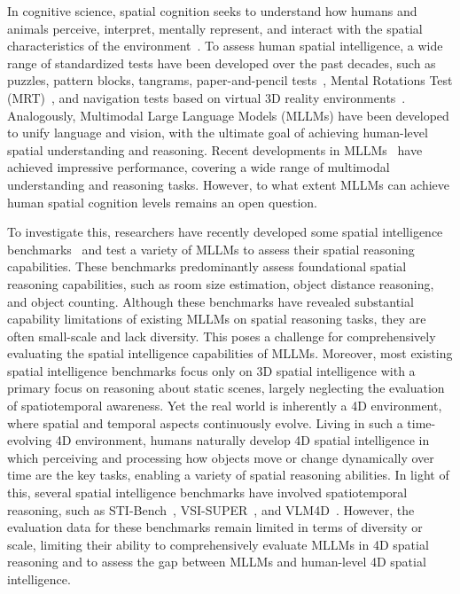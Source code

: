 \documentclass{article}
\begin{document}
In cognitive science, spatial cognition seeks to understand how humans and animals perceive, interpret, mentally represent, and interact with the spatial characteristics of the environment~\cite{waller2013handbook, newcombe2004spatial}.
To assess human spatial intelligence, a wide range of standardized tests have been developed over the past decades, such as puzzles, pattern blocks, tangrams, paper-and-pencil tests~\cite{carroll1993human,eliot1983international,hegarty2005individual}, Mental Rotations Test (MRT)~\cite{peters1995redrawn}, and navigation tests based on virtual 3D reality environments~\cite{wolbers2008spatial}.
Analogously, Multimodal Large Language Models (MLLMs) have been developed to unify language and vision, with the ultimate goal of achieving human-level spatial understanding and reasoning.
Recent developments in MLLMs~\cite{OpenAI2025,Gemini2025,zhang2025videollama,bai2025qwen2,wang2025internvl3} have achieved impressive performance, covering a wide range of multimodal understanding and reasoning tasks.
However, to what extent MLLMs can achieve human spatial cognition levels remains an open question.


To investigate this, researchers have recently developed some spatial intelligence benchmarks~\cite{Yang_2025_CVPR,yu2025far,liu2025mirage,gong2025space,deng2025internspatial,yang2025mmsi,ma20243dsrbench,cheng2024spatialrgpt,zhao2025mmvu,tang2025lego} and test a variety of MLLMs to assess their spatial reasoning capabilities.
These benchmarks predominantly assess foundational spatial reasoning capabilities, such as room size estimation, object distance reasoning, and object counting.
Although these benchmarks have revealed substantial capability limitations of existing MLLMs on spatial reasoning tasks, they are often small-scale and lack diversity.
This poses a challenge for comprehensively evaluating the spatial intelligence capabilities of MLLMs.
Moreover, most existing spatial intelligence benchmarks focus only on 3D spatial intelligence with a primary focus on reasoning about static scenes, largely neglecting the evaluation of spatiotemporal awareness.
Yet the real world is inherently a 4D environment, where spatial and temporal aspects continuously evolve.
Living in such a time-evolving 4D environment, humans naturally develop 4D spatial intelligence in which perceiving and processing how objects move or change dynamically over time are the key tasks, enabling a variety of spatial reasoning abilities.
In light of this, several spatial intelligence benchmarks have involved spatiotemporal reasoning, such as STI-Bench~\cite{li2025sti}, VSI-SUPER~\cite{yang2025cambrian}, and VLM4D~\cite{zhou2025vlm4d}.
However, the evaluation data for these benchmarks remain limited in terms of diversity or scale, limiting their ability to comprehensively evaluate MLLMs in 4D spatial reasoning and to assess the gap between MLLMs and human-level 4D spatial intelligence.
\end{document}
